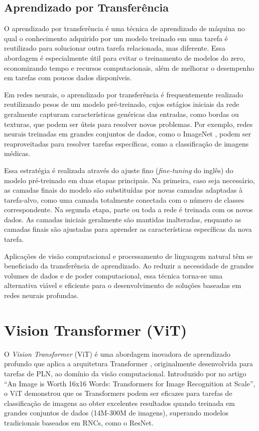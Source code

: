 \subsection{Aprendizado por Transferência}

O aprendizado por transferência \citep{Zhuang2021} é uma técnica de aprendizado de máquina no qual o conhecimento adquirido por um modelo treinado em uma tarefa é reutilizado para solucionar outra tarefa relacionada, mas diferente. Essa abordagem é especialmente útil para evitar o treinamento de modelos do zero, economizando tempo e recursos computacionais, além de melhorar o desempenho em tarefas com poucos dados disponíveis.

Em redes neurais, o aprendizado por transferência é frequentemente realizado reutilizando pesos de um modelo pré-treinado, cujos estágios iniciais da rede geralmente capturam características genéricas das entradas, como bordas ou texturas, que podem ser úteis para resolver novos problemas. Por exemplo, redes neurais treinadas em grandes conjuntos de dados, como o ImageNet \citep{Russakovsky2015}, podem ser reaproveitadas para resolver tarefas específicas, como a classificação de imagens médicas.

Essa estratégia é realizada através do ajuste fino (\textit{fine-tuning} do inglês) do modelo pré-treinado em duas etapas principais. Na primeira, caso seja necessário, as camadas finais do modelo são substituídas por novas camadas adaptadas à tarefa-alvo, como uma camada totalmente conectada com o número de classes correspondente. Na segunda etapa, parte ou toda a rede é treinada com os novos dados. As camadas iniciais geralmente são mantidas inalteradas, enquanto as camadas finais são ajustadas para aprender as características específicas da nova tarefa.

Aplicações de visão computacional e processamento de linguagem natural têm se beneficiado da transferência de aprendizado. Ao reduzir a necessidade de grandes volumes de dados e de poder computacional, essa técnica torna-se uma alternativa viável e eficiente para o desenvolvimento de soluções baseadas em redes neurais profundas.

\section{Vision Transformer (ViT)}\label{sec:vision-transformers}

O \textit{Vision Transformer} (ViT) é uma abordagem inovadora de aprendizado profundo que aplica a arquitetura Transformer \citep{vaswani2023attentionneed}, originalmente desenvolvida para tarefas de PLN, ao domínio da visão computacional. Introduzido por \cite{Dosovitskiy2021} no artigo ``An Image is Worth 16x16 Words: Transformers for Image Recognition at Scale'', o ViT demonstrou que os Transformers podem ser eficazes para tarefas de classificação de imagens ao obter excelentes resultados quando treinada em grandes conjuntos de dados (14M-300M de imagens), superando modelos tradicionais baseados em RNCs, como o ResNet.

